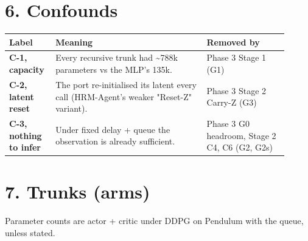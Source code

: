 \documentclass[11pt]{article}
\begin{document}
\section*{6. Confounds}



\begin{center}\small\begin{tabular}{>{\raggedright\arraybackslash}p{0.128\linewidth}>{\raggedright\arraybackslash}p{0.505\linewidth}>{\raggedright\arraybackslash}p{0.274\linewidth}}
\toprule
Label & Meaning & Removed by \\
\midrule
\textbf{C-1, capacity} & Every recursive trunk had \textasciitilde{}788k parameters vs the MLP's 135k. & Phase 3 Stage 1 (G1) \\
\textbf{C-2, latent reset} & The port re-initialised its latent every call (HRM-Agent's weaker "Reset-Z" variant). & Phase 3 Stage 2 Carry-Z (G3) \\
\textbf{C-3, nothing to infer} & Under fixed delay + queue the observation is already sufficient. & Phase 3 G0 headroom, Stage 2 C4, C6 (G2, G2s) \\
\bottomrule
\end{tabular}\end{center}



\section*{7. Trunks (arms)}



Parameter counts are actor + critic under DDPG on Pendulum with the queue, unless stated.
\end{document}
